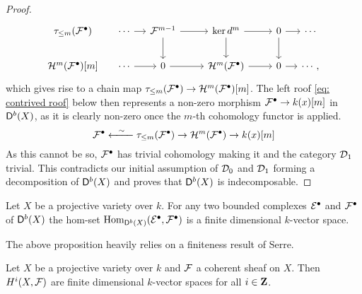 \begin{proof}
\[\begin{tikzcd}[row sep = small, column sep = small]
        {\rtruncation{m}(\mathcal F^\bullet)} & \cdots & {\mathcal F^{m-1}} && {\ker d^m} && 0 & \cdots \\
        \\
        {\mathcal H^m(\mathcal F^\bullet)[m]} & \cdots & 0 && {\mathcal H^m(\mathcal F^\bullet)} && 0 & \cdots,
        \arrow[from=1-2, to=1-3]
        \arrow[from=1-3, to=1-5]
        \arrow[from=1-3, to=3-3]
        \arrow[from=1-5, to=1-7]
        \arrow[from=1-5, to=3-5]
        \arrow[from=1-7, to=1-8]
        \arrow[from=1-7, to=3-7]
        \arrow[from=3-2, to=3-3]
        \arrow[from=3-3, to=3-5]
        \arrow[from=3-5, to=3-7]
        \arrow[from=3-7, to=3-8]
    \end{tikzcd}\]
    which gives rise to a chain map $\tau_{\leq m}(\mathcal F^\bullet) \to \mathcal H^m(\mathcal F^\bullet)[m]$. The left roof \eqref{eq: contrived roof} below then represents a non-zero morphism $\mathcal F^\bullet \to k(x)[m]$ in $\mathsf{D}^b(X)$, as it is clearly non-zero once the $m$-th cohomology functor is applied.
    \begin{equation}
        \label{eq: contrived roof}
        \mathcal F^\bullet \xleftarrow{\ \ \sim \ \ } \tau_{\leq m}(\mathcal F^\bullet) \to \mathcal H^m(\mathcal F^\bullet) \to k(x)[m]
    \end{equation}
    As this cannot be so, $\mathcal F^\bullet$ has trivial cohomology making it and the category $\mathcal D_1$ trivial. This contradicts our initial assumption of $\mathcal D_0$ and $\mathcal D_1$ forming a decomposition of $\mathsf{D}^b(X)$ and proves that $\mathsf{D}^b(X)$ is indecomposable. 
\end{proof}

\begin{proposition}
    \label{Db(X) has finite dimensional homs}
    Let $X$ be a projective variety over $k$.
    For any two bounded complexes $\mathcal E^\bullet$ and $\mathcal F^\bullet$ of $\mathsf{D}^b(X)$ the hom-set $\operatorname{Hom}_{\mathsf{D}^b(X)}(\mathcal E^\bullet, \mathcal F^\bullet)$ is a finite dimensional $k$-vector space. 
\end{proposition}

The above proposition heavily relies on a finiteness result of Serre.

\begin{theorem}
    \label{Serre finitness}
    Let $X$ be a projective variety over $k$ and $\mathcal F$ a coherent sheaf on $X$. Then $H^{i}(X, \mathcal F)$ are finite dimensional $k$-vector spaces for all $i \in \mathbf Z$.
\end{theorem}


